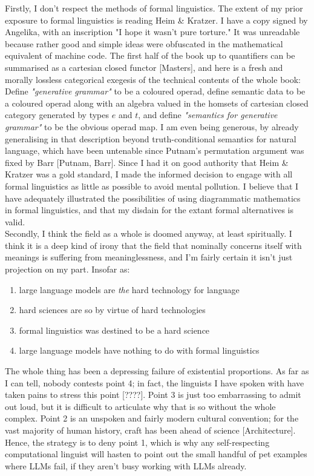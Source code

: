 Firstly, I don't respect the methods of formal linguistics. The extent of my prior exposure to formal linguistics is reading Heim \& Kratzer. I have a copy signed by Angelika, with an inscription "I hope it wasn't pure torture." It was unreadable because rather good and simple ideas were obfuscated in the mathematical equivalent of machine code. The first half of the book up to quantifiers can be summarised as a cartesian closed functor [Masters], and here is a fresh and morally lossless categorical exegesis of the technical contents of the whole book: Define \emph{"generative grammar"} to be a coloured operad, define semantic data to be a coloured operad along with an algebra valued in the homsets of cartesian closed category generated by types $e$ and $t$, and define \emph{"semantics for generative grammar"} to be the obvious operad map. I am even being generous, by already generalising in that description beyond truth-conditional semantics for natural language, which have been untenable since Putnam's permutation argument was fixed by Barr [Putnam, Barr]. Since I had it on good authority that Heim \& Kratzer was a gold standard, I made the informed decision to engage with all formal linguistics as little as possible to avoid mental pollution. I believe that I have adequately illustrated the possibilities of using diagrammatic mathematics in formal linguistics, and that my disdain for the extant formal alternatives is valid.\\

Secondly, I think the field as a whole is doomed anyway, at least spiritually. I think it is a deep kind of irony that the field that nominally concerns itself with meanings is suffering from meaninglessness, and I'm fairly certain it isn't just projection on my part. Insofar as:
\begin{enumerate}
\item large language models are \emph{the} hard technology for language
\item hard sciences are so by virtue of hard technologies
\item formal linguistics was destined to be a hard science
\item large language models have nothing to do with formal linguistics
\end{enumerate}
The whole thing has been a depressing failure of existential proportions. As far as I can tell, nobody contests point 4; in fact, the linguists I have spoken with have taken pains to stress this point [????]. Point 3 is just too embarrassing to admit out loud, but it is difficult to articulate why that is so without the whole complex. Point 2 is an unspoken and fairly modern cultural convention; for the vast majority of human history, craft has been ahead of science [Architecture]. Hence, the strategy is to deny point 1, which is why any self-respecting computational linguist will hasten to point out the small handful of pet examples where LLMs fail, if they aren't busy working with LLMs already.


